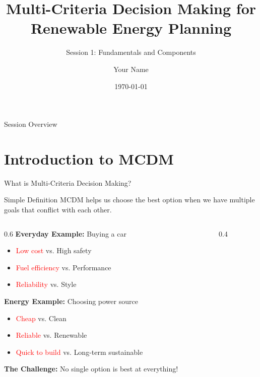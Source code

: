 \documentclass[aspectratio=169]{beamer}
\title[MCDM for Renewable Energy]{Multi-Criteria Decision Making for Renewable Energy Planning}
\subtitle{Session 1: Fundamentals and Components}
\author{Your Name}
\institute{Your Institution}
\date{\today}
\begin{document}
\begin{frame}
\titlepage
\end{frame}

\begin{frame}{Session Overview}
\tableofcontents
\end{frame}

\section{Introduction to MCDM}

\begin{frame}{What is Multi-Criteria Decision Making?}
\begin{block}{Simple Definition}
MCDM helps us choose the best option when we have multiple goals that conflict with each other.
\end{block}

\begin{columns}
\begin{column}{0.6\textwidth}
\textbf{Everyday Example:} Buying a car
\begin{itemize}
\item \textcolor{red}{Low cost} vs. \textcolor{energygreen}{High safety}
\item \textcolor{red}{Fuel efficiency} vs. \textcolor{energygreen}{Performance}
\item \textcolor{red}{Reliability} vs. \textcolor{energygreen}{Style}
\end{itemize}

\vspace{0.3cm}
\textbf{Energy Example:} Choosing power source
\begin{itemize}
\item \textcolor{red}{Cheap} vs. \textcolor{energygreen}{Clean}
\item \textcolor{red}{Reliable} vs. \textcolor{energygreen}{Renewable}
\item \textcolor{red}{Quick to build} vs. \textcolor{energygreen}{Long-term sustainable}
\end{itemize}

\vspace{0.3cm}
\textbf{The Challenge:} No single option is best at everything!
\end{column}
\begin{column}{0.4\textwidth}
\end{column}
\end{columns}
\end{frame}
\end{document}
